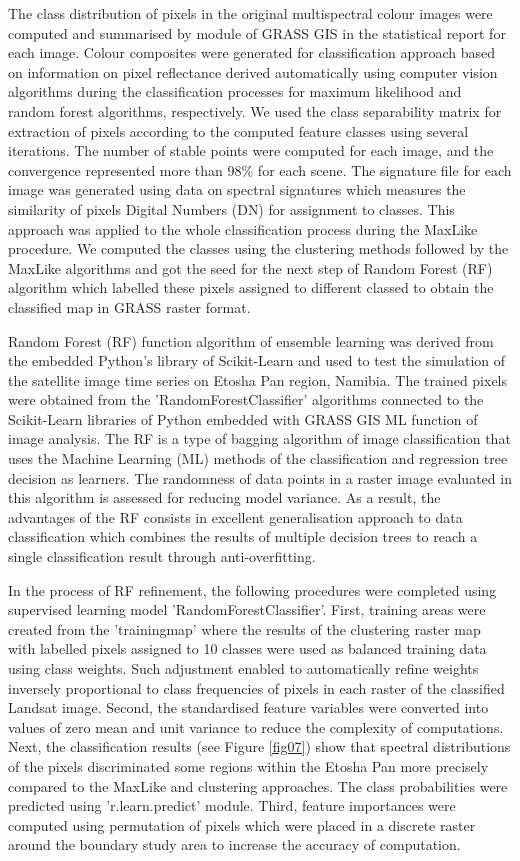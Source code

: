 \documentclass[climate,article,submit,pdftex,moreauthors]{Definitions/mdpi}
\begin{document}
The class distribution of pixels in the original multispectral colour images were computed and summarised by module of GRASS GIS in the statistical report for each image. Colour composites were generated for classification approach based on information on pixel reflectance derived automatically using computer vision algorithms during the classification processes for maximum likelihood and random forest algorithms, respectively. We used the class separability matrix for extraction of pixels according to the computed feature classes using several iterations. The number of stable points were computed for each image, and the convergence represented more than 98\% for each scene. The signature file for each image was generated using data on spectral signatures which measures the similarity  of pixels Digital Numbers (DN) for assignment to classes. This approach was applied to the whole classification process during the MaxLike procedure. We computed the classes using the clustering methods followed by the MaxLike algorithms and got the seed for the next step of Random Forest (RF) algorithm which labelled these pixels assigned to different classed to obtain the classified map in GRASS raster format. 

Random Forest (RF) function algorithm of ensemble learning was derived from the embedded Python's library of Scikit-Learn and used to test the simulation of the satellite image time series on Etosha Pan region, Namibia. The trained pixels were obtained from the 'RandomForestClassifier' algorithms connected to the Scikit-Learn libraries of Python \cite{Pedregosa} embedded with GRASS GIS ML function of image analysis. The RF is a type of bagging algorithm of image classification that uses the Machine Learning (ML) methods of the classification and regression tree decision as learners. The randomness of data points in a raster image evaluated in this algorithm is assessed for reducing model variance. As a result, the advantages of the RF consists in excellent generalisation approach to data classification which combines the results of multiple decision trees to reach a single classification result through anti-overfitting. 

In the process of RF refinement, the following procedures were completed using supervised learning model 'RandomForestClassifier'. First, training areas were created from the 'trainingmap' where the results of the clustering raster map with labelled pixels assigned to 10 classes were used as balanced training data using class weights. Such adjustment enabled to automatically refine weights inversely proportional to class frequencies of pixels in each raster of the classified Landsat image. Second, the standardised feature variables were converted into values of zero mean and unit variance to reduce the complexity of computations. Next, the classification results (see Figure \ref{fig07}) show that spectral distributions of the pixels discriminated some regions within the Etosha Pan more precisely compared to the MaxLike and clustering approaches. The class probabilities were predicted using 'r.learn.predict' module. Third, feature importances were computed using permutation of pixels which were placed in a discrete raster around the boundary study area  to increase the accuracy of computation. 
\end{document}
